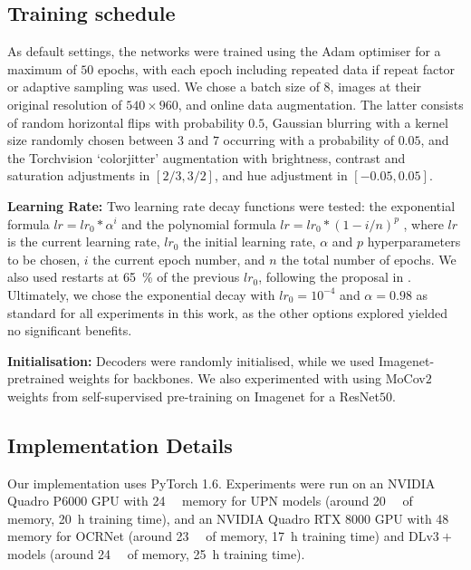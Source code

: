\documentclass[runningheads]{llncs}
\newcommand{\dvp}{DLv$3+$}
\newcommand{\upr}{UPN}
\newcommand{\tbf}[1]{\textbf{#1}}
\begin{document}
\subsection{Training schedule}\label{methods:training}
As default settings, the networks were trained using the Adam optimiser \cite{Adam} 
for a maximum of $50$ epochs, with each epoch including repeated data if repeat factor or adaptive sampling was used. We chose a batch size of $8$, images at their original resolution of $540 \times 960$, and online data augmentation. The latter consists of random horizontal flips with probability $0.5$, Gaussian blurring with a kernel size randomly chosen between $3$ and $7$ occurring with a probability of $0.05$, and the Torchvision `colorjitter' augmentation with brightness, contrast and saturation adjustments in $[2/3, 3/2]$, and hue adjustment in $[-0.05, 0.05]$.

\noindent\tbf{Learning Rate:}
Two learning rate decay functions were tested: the exponential formula $lr = lr_0 * \alpha^i$ and the polynomial formula $lr = lr_0 * (1 - i / n)^{p}$ \cite{polynomial}, where $lr$ is the current learning rate, $lr_0$ the initial learning rate, $\alpha$ and $p$ hyperparameters to be chosen, $i$ the current epoch number, and $n$ the total number of epochs. We also used restarts at \SI{65}{\percent} of the previous $lr_0$, following the proposal in \cite{polynomial}. Ultimately, we chose the exponential decay with $lr_0 = 10^{-4}$ and $\alpha = 0.98$ as standard for all experiments in this work, as the other options explored yielded no significant benefits.

\noindent\tbf{Initialisation:}
Decoders were randomly initialised, while we used Imagenet-pretrained weights for backbones. We also experimented with using MoCov$2$ weights from self-supervised pre-training on Imagenet \cite{MoCov2} for a ResNet$50$.

\subsection{Implementation Details}\label{methods:ware}
Our implementation uses PyTorch 1.6. Experiments were run on an NVIDIA Quadro P6000 GPU with \SI{24}{\giga\byte} memory for \upr{} models (around \SI{20}{\giga\byte} of memory, \SI{20}{\hour} training time), and an NVIDIA Quadro RTX 8000 GPU with \SI{48}{\giga\byte} memory for OCRNet (around \SI{23}{\giga\byte} of memory, \SI{17}{\hour} training time) and \dvp{} models (around \SI{24}{\giga\byte} of memory, \SI{25}{\hour} training time).
\end{document}
